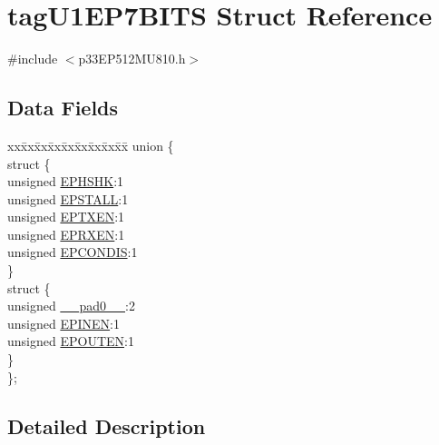 \hypertarget{structtag_u1_e_p7_b_i_t_s}{}\section{tag\+U1\+E\+P7\+B\+I\+TS Struct Reference}
\label{structtag_u1_e_p7_b_i_t_s}


{\ttfamily \#include $<$p33\+E\+P512\+M\+U810.\+h$>$}

\subsection*{Data Fields}
\begin{DoxyCompactItemize}
\item 
\begin{tabbing}
xx\=xx\=xx\=xx\=xx\=xx\=xx\=xx\=xx\=\kill
union \{\\
\>struct \{\\
\>\>unsigned \hyperlink{structtag_u1_e_p7_b_i_t_s_a0d06430217cb4b189fbe9d0c4b460482}{EPHSHK}:1\\
\>\>unsigned \hyperlink{structtag_u1_e_p7_b_i_t_s_a47042104f04ebe06a23f9789bd400d7e}{EPSTALL}:1\\
\>\>unsigned \hyperlink{structtag_u1_e_p7_b_i_t_s_aa2d88c1be513e759c136823c86a355b4}{EPTXEN}:1\\
\>\>unsigned \hyperlink{structtag_u1_e_p7_b_i_t_s_a8a388d32ceffb87230e660b6793f2857}{EPRXEN}:1\\
\>\>unsigned \hyperlink{structtag_u1_e_p7_b_i_t_s_a1bd26df05d2b5a11b20ee548fce90c3e}{EPCONDIS}:1\\
\>\} \\
\>struct \{\\
\>\>unsigned \hyperlink{structtag_u1_e_p7_b_i_t_s_adf71f3d8410c1f1dbbc96680a92c49af}{\_\_pad0\_\_}:2\\
\>\>unsigned \hyperlink{structtag_u1_e_p7_b_i_t_s_a8b6d98cdf233ac90ff19d16d9a89215e}{EPINEN}:1\\
\>\>unsigned \hyperlink{structtag_u1_e_p7_b_i_t_s_adf87e8acfbb27a5626e21b3e3bd106fd}{EPOUTEN}:1\\
\>\} \\
\}; \\

\end{tabbing}\end{DoxyCompactItemize}


\subsection{Detailed Description}


